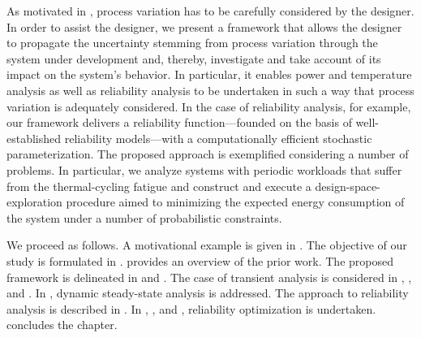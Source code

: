 As motivated in , process variation has to be carefully
considered by the designer. In order to assist the designer, we present a
framework that allows the designer to propagate the uncertainty stemming from
process variation through the system under development and, thereby, investigate
and take account of its impact on the system's behavior. In particular, it
enables power and temperature analysis as well as reliability analysis to be
undertaken in such a way that process variation is adequately considered. In the
case of reliability analysis, for example, our framework delivers a reliability
function---founded on the basis of well-established reliability models---with a
computationally efficient stochastic parameterization. The proposed approach is
exemplified considering a number of problems. In particular, we analyze systems
with periodic workloads that suffer from the thermal-cycling fatigue and
construct and execute a design-space-exploration procedure aimed to minimizing
the expected energy consumption of the system under a number of probabilistic
constraints.

We proceed as follows. A motivational example is given in
. The objective of our study is formulated in
.  provides an overview of the prior work.
The proposed framework is delineated in  and
. The case of transient analysis is considered
in , , and
. In ,
dynamic steady-state analysis is addressed. The approach to reliability analysis
is described in . In
, , and
, reliability optimization is undertaken.
 concludes the chapter.
